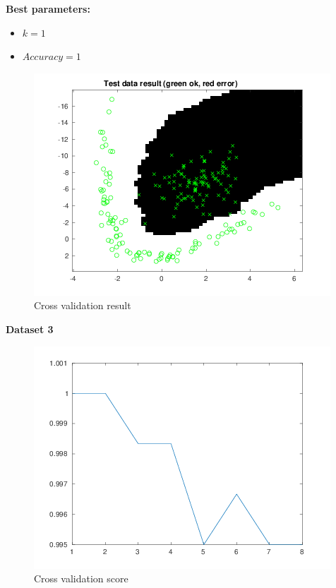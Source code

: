 \documentclass[a4paper,12pt]{article}
\begin{document}
\textbf{Best parameters:}
\begin{itemize}
\item $k = 1$
\item $Accuracy = 1$
\end{itemize}

\begin{figure}[H]
\centering
\caption{Cross validation result}\label{fig:kNN-2-cv}
  \begin{minipage}[]{1\textwidth}
  \includegraphics[width=\textwidth]{figures/kNN_2_cv.png}
  \end{minipage}
\end{figure}


\noindent \textbf{Dataset 3}

\begin{figure}[H]
\centering
\caption{Cross validation score}\label{fig:kNN-3-cv-score}
  \begin{minipage}[]{1\textwidth}
  \includegraphics[width=\textwidth]{figures/kNN_3_cv_score.png}
  \end{minipage}
\end{figure}
\end{document}
